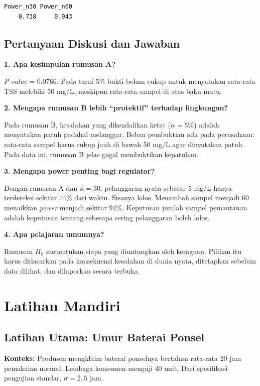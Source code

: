 \documentclass[
  indonesian,
  letterpaper,
]{book}
\begin{document}
\begin{verbatim}
Power_n30 Power_n60 
    0.738     0.943 
\end{verbatim}

\section{Pertanyaan Diskusi dan
Jawaban}\label{pertanyaan-diskusi-dan-jawaban-1}

\textbf{1. Apa kesimpulan rumusan A?}

\emph{P-value} = 0.0766. Pada taraf 5\% bukti belum cukup untuk
menyatakan rata-rata TSS melebihi 50 mg/L, meskipun rata-rata sampel di
atas baku mutu.

\textbf{2. Mengapa rumusan B lebih ``protektif'' terhadap lingkungan?}

Pada rumusan B, kesalahan yang dikendalikan ketat (\(\alpha = 5\%\))
adalah menyatakan patuh padahal melanggar. Beban pembuktian ada pada
perusahaan: rata-rata sampel harus cukup jauh di bawah 50 mg/L agar
dinyatakan patuh. Pada data ini, rumusan B jelas gagal membuktikan
kepatuhan.

\textbf{3. Mengapa power penting bagi regulator?}

Dengan rumusan A dan \(n = 30\), pelanggaran nyata sebesar 5 mg/L hanya
terdeteksi sekitar 74\% dari waktu. Sisanya lolos. Menambah sampel
menjadi 60 menaikkan \emph{power} menjadi sekitar 94\%. Keputusan jumlah
sampel pemantauan adalah keputusan tentang seberapa sering pelanggaran
boleh lolos.

\textbf{4. Apa pelajaran umumnya?}

Rumusan \(H_0\) menentukan siapa yang diuntungkan oleh keraguan. Pilihan
itu harus didasarkan pada konsekuensi kesalahan di dunia nyata,
ditetapkan sebelum data dilihat, dan dilaporkan secara terbuka.


\chapter{Latihan Mandiri}\label{latihan-mandiri-1}

\section{Latihan Utama: Umur Baterai
Ponsel}\label{latihan-utama-umur-baterai-ponsel}

\textbf{Konteks:} Produsen mengklaim baterai ponselnya bertahan
rata-rata 20 jam pemakaian normal. Lembaga konsumen menguji 40 unit.
Dari spesifikasi pengujian standar, \(\sigma = 2{,}5\) jam.
\end{document}
